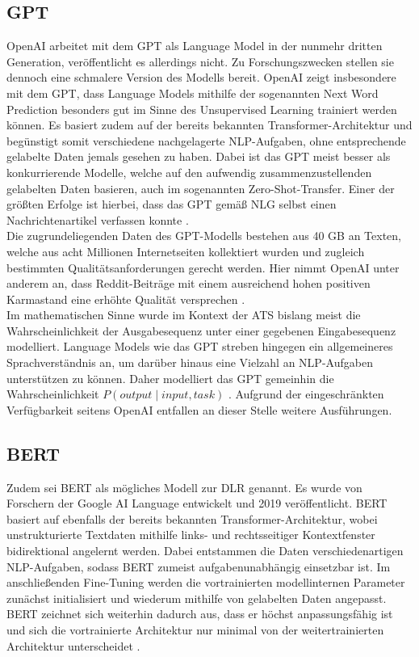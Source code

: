 \subsection{GPT}
\noindent
OpenAI arbeitet mit dem \ac{GPT} als Language Model in der nunmehr dritten Generation, veröffentlicht es allerdings nicht. Zu Forschungszwecken stellen sie dennoch eine schmalere Version des Modells bereit. OpenAI zeigt insbesondere mit dem \ac{GPT}, dass Language Models mithilfe der sogenannten Next Word Prediction besonders gut im Sinne des Unsupervised Learning trainiert werden können. Es basiert zudem auf der bereits bekannten Transformer-Architektur und begünstigt somit verschiedene nachgelagerte \ac{NLP}-Aufgaben, ohne entsprechende gelabelte Daten jemals gesehen zu haben. Dabei ist das \ac{GPT} meist besser als konkurrierende Modelle, welche auf den aufwendig zusammenzustellenden gelabelten Daten basieren, auch im sogenannten Zero-Shot-Transfer. Einer der größten Erfolge ist hierbei, dass das \ac{GPT} gemäß \ac{NLG} selbst einen Nachrichtenartikel verfassen konnte \cite[S.~1]{RAD19}.\\

\noindent
Die zugrundeliegenden Daten des \ac{GPT}-Modells bestehen aus 40 GB an Texten, welche aus acht Millionen Internetseiten kollektiert wurden und zugleich bestimmten Qualitätsanforderungen gerecht werden. Hier nimmt OpenAI unter anderem an, dass Reddit-Beiträge mit einem ausreichend hohen positiven Karmastand eine erhöhte Qualität versprechen \cite[S.~3]{RAD19}.\\

\noindent
Im mathematischen Sinne wurde im Kontext der \ac{ATS} bislang meist die Wahrscheinlichkeit der Ausgabesequenz unter einer gegebenen Eingabesequenz modelliert. Language Models wie das \ac{GPT} streben hingegen ein allgemeineres Sprachverständnis an, um darüber hinaus eine Vielzahl an \ac{NLP}-Aufgaben unterstützen zu können. Daher modelliert das \ac{GPT} gemeinhin die Wahrscheinlichkeit $P(output \mid input, task)$ \cite[S.~2]{RAD19}. Aufgrund der eingeschränkten Verfügbarkeit seitens OpenAI entfallen an dieser Stelle weitere Ausführungen.


\subsection{BERT}
\noindent
Zudem sei \ac{BERT} als mögliches Modell zur \ac{DLR} genannt. Es wurde von Forschern der Google AI Language entwickelt und 2019 veröffentlicht. \ac{BERT} basiert auf ebenfalls der bereits bekannten Transformer-Architektur, wobei unstrukturierte Textdaten mithilfe links- und rechtsseitiger Kontextfenster bidirektional angelernt werden. Dabei entstammen die Daten verschiedenartigen \ac{NLP}-Aufgaben, sodass \ac{BERT} zumeist aufgabenunabhängig einsetzbar ist. Im anschließenden Fine-Tuning werden die vortrainierten modellinternen Parameter zunächst initialisiert und wiederum mithilfe von gelabelten Daten angepasst. \ac{BERT} zeichnet sich weiterhin dadurch aus, dass er höchst anpassungsfähig ist und sich die vortrainierte Architektur nur minimal von der weitertrainierten Architektur unterscheidet \cite[S.~1-3]{DEV19}.\\

